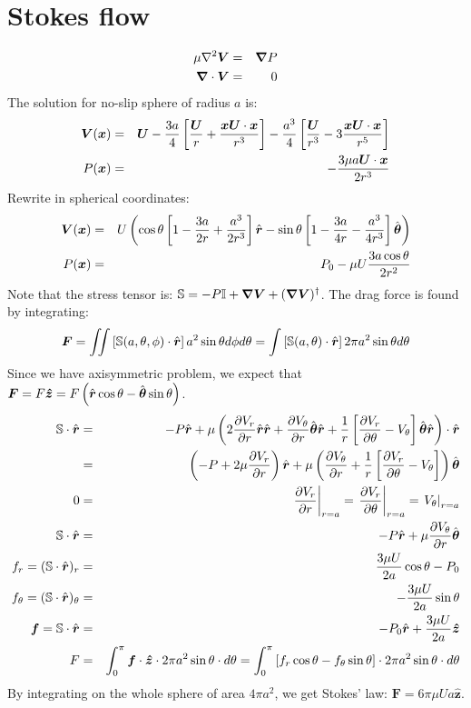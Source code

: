 \section{Stokes flow}
\begin{eqnarray}
\mu \nabla^2 \boldsymbol{V} &=& \boldsymbol{\nabla} P \\
\boldsymbol{\nabla} \cdot \boldsymbol{V} &=& 0
\end{eqnarray}
The solution for no-slip sphere of radius $a$ is:
\begin{eqnarray}
\boldsymbol{V}(\boldsymbol{x}) &=& \mathscr{\boldsymbol{U}} -
\frac{3a}{4} \left[ \frac{\mathscr{\boldsymbol{U}}}{r} + \frac{\boldsymbol{x} \mathscr{\boldsymbol{U}} \cdot \boldsymbol{x}}{r^3} \right] -
\frac{a^3}{4} \left[ \frac{\mathscr{\boldsymbol{U}}}{r^3} - 3\frac{\boldsymbol{x} \mathscr{\boldsymbol{U}} \cdot \boldsymbol{x}}{r^5} \right] \\
P(\boldsymbol{x}) &=& -\frac{3\mu a \mathscr{\boldsymbol{U}} \cdot \boldsymbol{x}}{2r^3}
\end{eqnarray}
Rewrite in spherical coordinates:
\begin{eqnarray}
\boldsymbol{V}(\boldsymbol{x}) &=& U \left(
\cos\theta \left[1 - \frac{3a}{2r} + \frac{a^3}{2r^3}\right] \hat{\boldsymbol{r}} -
\sin\theta \left[1 - \frac{3a}{4r} - \frac{a^3}{4r^3}\right] \hat{\boldsymbol{\theta}}
\right) \\
P(\boldsymbol{x}) &=& P_0 -\mu U \frac{3a \cos\theta}{2r^2}
\end{eqnarray}
Note that the stress tensor is:
$\mathbb{S} = -P \mathbb{I} + \boldsymbol{\nabla} \boldsymbol{V} + (\boldsymbol{\nabla} \boldsymbol{V})^\dagger$.
The drag force is found by integrating:
\begin{eqnarray}
\boldsymbol{F} = \iint{\left[\mathbb{S}(a,\theta, \phi) \cdot \hat{\boldsymbol{r}}\right] a^2 \sin\theta d\phi d\theta} =
\int{\left[\mathbb{S}(a,\theta) \cdot \hat{\boldsymbol{r}}\right] 2 \pi a^2 \sin\theta d\theta}
\end{eqnarray}
Since we have axisymmetric problem, we expect that
$\boldsymbol{F} = F \boldsymbol{\hat{z}} = F \left(\hat{\boldsymbol{r}} \cos\theta - \hat{\boldsymbol{\theta}} \sin\theta\right)$.
\begin{eqnarray}
\mathbb{S} \cdot \hat{\boldsymbol{r}} &=& -P \hat{\boldsymbol{r}} + \mu \left(
2\frac{\partial V_r}{\partial r}\hat{\boldsymbol{r}}\hat{\boldsymbol{r}} + \frac{\partial V_\theta}{\partial r}\hat{\boldsymbol{\theta}}\hat{\boldsymbol{r}} +
\frac{1}{r}\left[\frac{\partial V_r}{\partial \theta} - V_\theta \right]\hat{\boldsymbol{\theta}}\hat{\boldsymbol{r}}
\right) \cdot \hat{\boldsymbol{r}} \\
&=& \left(-P + 2\mu \frac{\partial V_r}{\partial r}\right)\hat{\boldsymbol{r}}
+ \mu \left(\frac{\partial V_\theta}{\partial r} + \frac{1}{r}\left[\frac{\partial V_r}{\partial \theta} -
V_\theta \right]\right)\hat{\boldsymbol{\theta}} \\
0 &=& \left.\frac{\partial V_r}{\partial r}\right|_{r=a} =
\left.\frac{\partial V_r}{\partial \theta}\right|_{r=a} =
\left.V_\theta\right|_{r=a} \\
\mathbb{S} \cdot \hat{\boldsymbol{r}} &=&
-P\hat{\boldsymbol{r}} + \mu \frac{\partial V_\theta}{\partial r}\hat{\boldsymbol{\theta}} \\
f_r = (\mathbb{S} \cdot \hat{\boldsymbol{r}})_r &=& \frac{3 \mu U}{2a} \cos\theta - P_0 \\
f_\theta = (\mathbb{S} \cdot \hat{\boldsymbol{r}})_\theta &=& -\frac{3\mu U}{2a} \sin\theta \\
\boldsymbol{f} = \mathbb{S} \cdot \hat{\boldsymbol{r}} &=& -P_0 \hat{\boldsymbol{r}} + \frac{3\mu U}{2a} \boldsymbol{\hat{z}} \\
F &=& 
\int_0^\pi \boldsymbol{f} \cdot \boldsymbol{\hat{z}} \cdot 2\pi a^2 \sin\theta \cdot d\theta =
\int_0^\pi \left[f_r \cos\theta - f_\theta \sin\theta\right] \cdot 2\pi a^2 \sin\theta \cdot d\theta
\end{eqnarray}
By integrating on the whole sphere of area $4\pi a^2$, we get Stokes' law:
$\boldsymbol{F} = 6\pi \mu U a \boldsymbol{\hat{z}}$.


